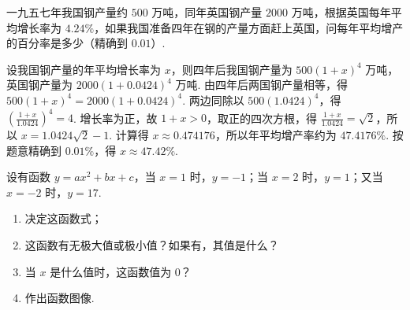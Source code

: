 \begin{problem}
一九五七年我国钢产量约 \(500\text{ 万吨}\)，同年英国钢产量 \(2000\text{ 万吨}\)，根据英国每年平均增长率为 \(4.24\%\)，如果我国准备四年在钢的产量方面赶上英国，问每年平均增产的百分率是多少（精确到 \(0.01\)）.
\end{problem}

\begin{solution}
设我国钢产量的年平均增长率为 \(x\)，则四年后我国钢产量为 \(500\left(1+x\right)^{4}\text{ 万吨}\)，英国钢产量为 \(2000\left(1+0.0424\right)^{4}\text{ 万吨}\). 由四年后两国钢产量相等，得
\(500\left(1+x\right)^{4}=2000\left(1+0.0424\right)^{4}\).
两边同除以 \(500\left(1.0424\right)^{4}\)，得
\(\left(\frac{1+x}{1.0424}\right)^{4}=4\).
增长率为正，故 \(1+x>0\)，取正的四次方根，得
\(\frac{1+x}{1.0424}=\sqrt{2}\)，所以 \(x=1.0424\sqrt{2}-1\).
计算得 \(x\approx0.474176\)，所以年平均增产率约为 \(47.4176\%\). 按题意精确到 \(0.01\%\)，得 \(x\approx47.42\%\).
\end{solution}

\begin{problem}
设有函数 \(y=ax^{2}+bx+c\)，当 \(x=1\) 时，\(y=-1\)；当 \(x=2\) 时，\(y=1\)；又当 \(x=-2\) 时，\(y=17\).

\begin{enumerate}
\item 决定这函数式；
\item 这函数有无极大值或极小值？如果有，其值是什么？
\item 当 \(x\) 是什么值时，这函数值为 \(0\)？
\item 作出函数图像.
\end{enumerate}
\end{problem}

